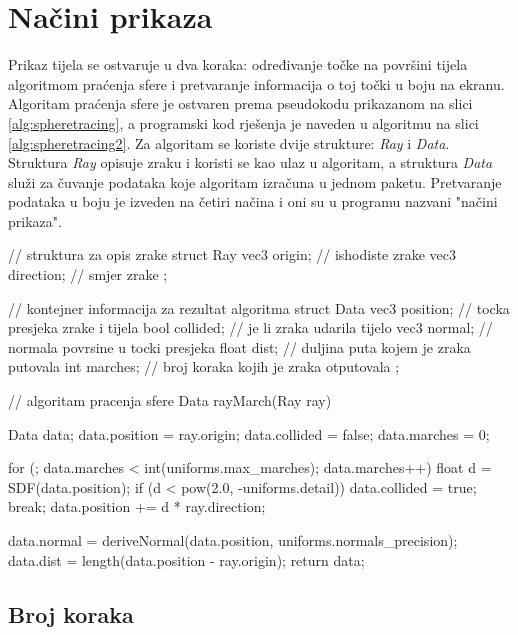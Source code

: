 \documentclass[zavrsnirad, upload]{fer}
\newenvironment{code}[2]{
    \def\codecaption{#1}
    \def\codelabel{#2}
    \figure[h]
    \centering
    \mdframed[linewidth=0.8pt]
    \footnotesize
    \verbatim
}{
    \endverbatim
    \endmdframed
    \caption{\codecaption}
    \label{\codelabel}
    \endfigure
}
\begin{document}
\newpage{}

\section{Načini prikaza}
\label{podpog:nacini_prikaza}

Prikaz tijela se ostvaruje u dva koraka: određivanje točke na površini tijela algoritmom praćenja sfere i pretvaranje informacija o toj točki u boju na ekranu. Algoritam praćenja sfere je ostvaren prema pseudokodu prikazanom na slici \ref{alg:spheretracing}, a programski kod rješenja je naveden u algoritmu na slici \ref{alg:spheretracing2}. Za algoritam se koriste dvije strukture: \emph{Ray} i \emph{Data}. Struktura \emph{Ray} opisuje zraku i koristi se kao ulaz u algoritam, a struktura \emph{Data} služi za čuvanje podataka koje algoritam izračuna u jednom paketu. Pretvaranje podataka u boju je izveden na četiri načina i oni su u programu nazvani "načini prikaza".

\begin{code}{Isječak programskog koda za praćenje sfere}{alg:spheretracing2}
// struktura za opis zrake    
struct Ray {
    vec3 origin; // ishodiste zrake
    vec3 direction; // smjer zrake
};

// kontejner informacija za rezultat algoritma
struct Data {
    vec3 position; // tocka presjeka zrake i tijela
    bool collided; // je li zraka udarila tijelo
    vec3 normal; // normala povrsine u tocki presjeka
    float dist; // duljina puta kojem je zraka putovala
    int marches; // broj koraka kojih je zraka otputovala
};

// algoritam pracenja sfere
Data rayMarch(Ray ray) {
    Data data;
    data.position = ray.origin;
    data.collided = false;
    data.marches = 0;

    for (; data.marches < int(uniforms.max_marches); data.marches++) {
        float d = SDF(data.position);
        if (d < pow(2.0, -uniforms.detail)) {
            data.collided = true;
            break;
        }
        data.position += d * ray.direction;
    }

    data.normal = deriveNormal(data.position, uniforms.normals_precision);
    data.dist = length(data.position - ray.origin); 
    return data;
}
\end{code}

\newpage{}

\subsection{Broj koraka}
\end{document}

